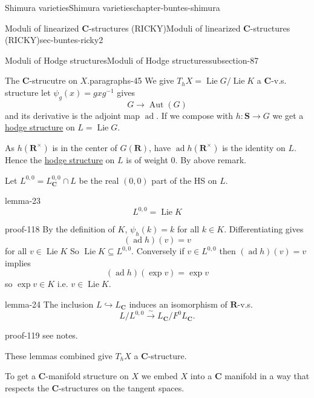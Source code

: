 \documentclass[oneside,10pt,]{book}
\numberwithin{equation}{section}
\newcommand{\Lie}{\operatorname{Lie}}
\newcommand{\inv}{^{-1}}
\newcommand{\RR}{\mathbf{R}}
\newcommand{\CC}{\mathbf{C}}
\DeclareMathOperator{\ad}{ad}
\DeclareMathOperator{\Aut}{Aut}
\begin{document}
\begin{chapterptx}{Shimura varieties}{}{Shimura varieties}{}{}{chapter-buntes-shimura}
\begin{sectionptx}{Moduli of linearized \(\CC\)-structures (RICKY)}{}{Moduli of linearized \(\CC\)-structures (RICKY)}{}{}{sec-buntes-ricky2}
\begin{subsectionptx}{Moduli of Hodge structures}{}{Moduli of Hodge structures}{}{}{subsection-87}
\begin{paragraphs}{The \(\CC\)-strucutre on \(X\).}{paragraphs-45}
\hypertarget{p-1186}{}%
We give \(T_hX = \Lie G / \Lie K\) a \(\CC\)-v.s. structure let \(\psi_g (x)  = g x g \inv\) gives%
\begin{equation*}
G\to \Aut(G)
\end{equation*}
and its derivative is the adjoint map \(\ad\). If we compose with \(h \colon \mathbf S\to G\) we get a \hyperref[def-hodge-str]{hodge structure} on \(L=  \Lie G\).%
\par
\hypertarget{p-1187}{}%
As \(h(\RR^\times)\) is in the center of \(G(\RR)\), have \(\ad h(\RR^\times)\) is the identity on \(L\). Hence the \hyperref[def-hodge-str]{hodge structure} on \(L\) is of weight 0. By above remark.%
\par
\hypertarget{p-1188}{}%
Let \(L^{0,0} = L_\CC^{0,0} \cap L\) be the real \((0,0)\) part of the HS on \(L\).%
\begin{lemma}{}{}{lemma-23}%
\hypertarget{p-1189}{}%
%
\begin{equation*}
L^{0,0} = \Lie K
\end{equation*}
%
\end{lemma}
\begin{proofptx}{}{proof-118}
\hypertarget{p-1190}{}%
By the definition of \(K\), \(\psi_h(k) = k\) for all \(k \in K\). Differentiating gives%
\begin{equation*}
(\ad h) (v) = v
\end{equation*}
for all \(v \in \Lie K\) So \(\Lie K  \subseteq L^{0,0}\). Conversely if \(v \in L^{0,0}\) then \((\ad h) (v)=v\) implies%
\begin{equation*}
(\ad h)(\exp v) = \exp v
\end{equation*}
so \(\exp v \in K\) i.e. \(v \in \Lie K\).%
\end{proofptx}
\begin{lemma}{}{}{lemma-24}%
\hypertarget{p-1191}{}%
The inclusion \(L \hookrightarrow L_\CC\) induces an isomorphism of \(\RR\)-v.s.%
\begin{equation*}
L/L^{0,0} \xrightarrow\sim L_\CC / F^0 L_\CC\text{.}
\end{equation*}
%
\end{lemma}
\begin{proofptx}{}{proof-119}
\hypertarget{p-1192}{}%
see notes.%
\end{proofptx}
\hypertarget{p-1193}{}%
These lemmas combined give \(T_h X\) a  \(\CC\)-structure.%
\par
\hypertarget{p-1194}{}%
To get a \(\CC\)-manifold structure on \(X\) we embed \(X\) into a \(\CC\) manifold in a way that respects the \(\CC\)-structures on the tangent spaces.%

\end{paragraphs}
\end{subsectionptx}
\end{sectionptx}
\end{chapterptx}
\end{document}

